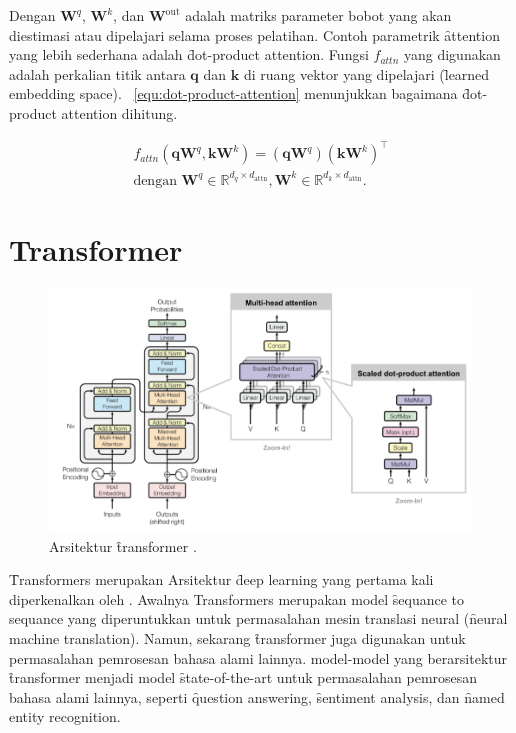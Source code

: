 	Dengan $\mathbf{W}^q$, $\mathbf{W}^k$, dan $\mathbf{W}^{\text{out}}$ adalah matriks parameter bobot yang akan diestimasi atau dipelajari selama proses pelatihan. Contoh parametrik \f{attention} yang lebih sederhana adalah \f{dot-product attention}. Fungsi $f_{attn}$ yang digunakan adalah perkalian titik antara $\mathbf{q}$ dan $\mathbf{k}$ di ruang vektor yang dipelajari (\f{learned embedding space}). \equ~\ref{equ:dot-product-attention} menunjukkan bagaimana \f{dot-product attention} dihitung.

	\begin{align}
		\label{equ:dot-product-attention}
		f_{attn}(\mathbf{q} \mathbf{W}^q, \mathbf{k} \mathbf{W}^k) = (\mathbf{q} \mathbf{W}^q) (\mathbf{k} \mathbf{W}^k)^{\top}\\
		\text{dengan } \mathbf{W}^q \in \mathbb{R}^{d_q \times d_{\text{attn}}}, \mathbf{W}^k \in \mathbb{R}^{d_k \times d_{\text{attn}}}.
	\end{align}

\section{Transformer}


	\begin{figure}
		\centering
		\includegraphics[width=1\textwidth]{assets/pics/lilianweng-transformer.png}
		\caption{Arsitektur \f{transformer} \citep{weng2018attention}.}
		\label{fig:transformer}
	\end{figure}

	\f{Transformers} merupakan Arsitektur \f{deep learning} yang pertama kali diperkenalkan oleh \cite{transformerori}. Awalnya Transformers merupakan model \f{sequance to sequance} yang diperuntukkan untuk permasalahan mesin translasi neural (\f{neural machine translation}). Namun, sekarang \f{transformer} juga digunakan untuk permasalahan pemrosesan bahasa alami lainnya. model-model yang berarsitektur \f{transformer} menjadi model \f{state-of-the-art} untuk permasalahan pemrosesan bahasa alami lainnya, seperti \f{question answering}, \f{sentiment analysis}, dan \f{named entity recognition}.
 
